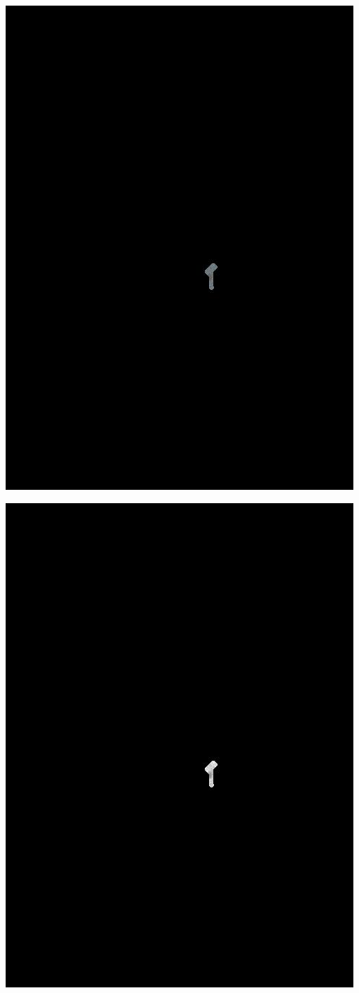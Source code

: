 \begin{Figure}
  \centering
    \includegraphics[width=0.5\columnwidth]{im7_mask.jpg}
\end{Figure}

\begin{Figure}
  \centering
    \includegraphics[width=0.5\columnwidth]{im7_eye.jpg}
\end{Figure}

